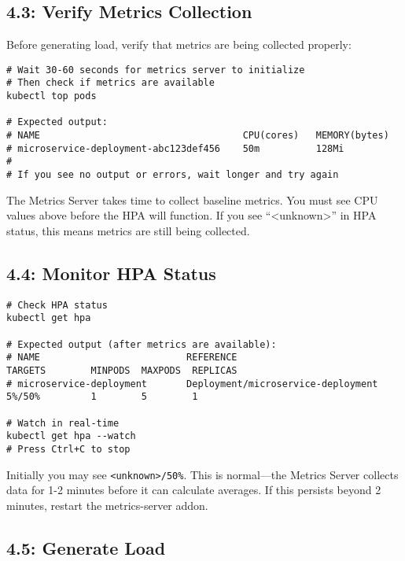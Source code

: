 \documentclass[12pt,a4paper]{article}
\begin{document}
\subsection{4.3: Verify Metrics Collection}

Before generating load, verify that metrics are being collected properly:

\begin{lstlisting}[caption=Verify metrics are flowing]
# Wait 30-60 seconds for metrics server to initialize
# Then check if metrics are available
kubectl top pods

# Expected output:
# NAME                                    CPU(cores)   MEMORY(bytes)
# microservice-deployment-abc123def456    50m          128Mi
#
# If you see no output or errors, wait longer and try again
\end{lstlisting}

\begin{importantbox}
The Metrics Server takes time to collect baseline metrics. You must see CPU values above before the HPA will function. If you see ``<unknown>'' in HPA status, this means metrics are still being collected.
\end{importantbox}

\subsection{4.4: Monitor HPA Status}

\begin{lstlisting}[caption=Monitor HPA]
# Check HPA status
kubectl get hpa

# Expected output (after metrics are available):
# NAME                          REFERENCE                              TARGETS        MINPODS  MAXPODS  REPLICAS
# microservice-deployment       Deployment/microservice-deployment     5%/50%         1        5        1

# Watch in real-time
kubectl get hpa --watch
# Press Ctrl+C to stop
\end{lstlisting}

\begin{tipbox}
Initially you may see \texttt{<unknown>/50\%}. This is normal—the Metrics Server collects data for 1-2 minutes before it can calculate averages. If this persists beyond 2 minutes, restart the metrics-server addon.
\end{tipbox}

\subsection{4.5: Generate Load}
\end{document}
